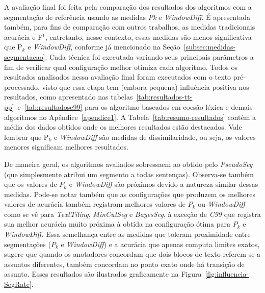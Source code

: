 A avaliação final foi feita pela comparação dos resultados dos algoritmos com a segmentação de referência usando as medidas \textit{Pk} e \textit{WindowDiff}. É apresentada também, para fins de comparação com outros trabalhos, as medidas tradicionais acurácia e F$^1$, entretanto, nesse contexto, essas medidas são menos significativa que P$_k$ e \textit{WindowDiff}, conforme já mencionado na Seção~\ref{subsec:medidas-segmentacao}. 
Cada técnica foi executada variando seus principais parâmetros a fim de verificar qual configuração melhor otimiza cada algoritmo. 
Todos os resultados analisados nessa avaliação final foram executados com o texto pré-processado, visto que essa etapa tem (embora pequena) influência positiva nos resultados, como apresentado nas tabelas~\ref{tab:resultados-tt-pp}~e~\ref{tab:resultadosc99} para os algoritmo baseados em coesão léxica e demais algoritmos no Apêndice~\ref{apendice1}.
%
A Tabela~\ref{tab:resumo-resultados} contém a média dos dados obtidos onde os melhores resultados estão destacados. Vale lembrar que P$_k$ e \textit{WindowDiff} são medidas de dissimilaridade, ou seja, os valores menores significam melhores resultados.





De maneira geral, os algoritmos avaliados sobressaem ao obtido pelo \textit{PseudoSeg} (que simplesmente atribui um segmento a todas sentenças). Observa-se também que os valores de $P_k$ e \textit{WindowDiff} são próximos devido a natureza similar dessas medidas. Pode-se notar também que as configurações que produzem os melhores valores de acurácia também registram melhores valores de $P_k$ ou \textit{WindowDiff} como se vê para \textit{TextTiling}, \textit{MinCutSeg} e \textit{BayesSeg}, à exceção de \textit{C99} que registra sua melhor acurácia muito próxima à obtida na configuração ótima para $P_k$ e \textit{WindowDiff.} 
Essa semelhança entre as medidas que toleram proximidade entre segmentações ($P_k$  e \textit{WindowDiff}) e a acurácia que apenas computa limites exatos, sugere que quando os anotadores concordam que dois blocos de texto referem-se a assuntos diferentes, também concordam no ponto exato onde há transição de assunto.  Esses resultados são ilustrados graficamente na Figura~\ref{fig:influencia-SegRate}.



